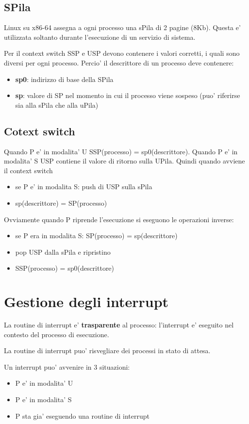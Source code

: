 \documentclass[12pt, a4paper]{report}
\begin{document}
\subsection{SPila}
Linux su x86-64 assegna a ogni processo una sPila di 2 pagine (8Kb). Questa e'
utilizzata soltanto durante l'esecuzione di un servizio di sistema.

Per il context switch SSP e USP devono contenere i valori corretti, i quali sono
diversi per ogni processo. Percio' il descrittore di un processo deve contenere:
\begin{itemize}
	\item \textbf{sp0}: indirizzo di base della SPila
	\item \textbf{sp}: valore di SP nel momento in cui il processo viene sospeso
	      (puo' riferirse sia alla sPila che alla uPila)
\end{itemize}
\subsection{Cotext switch}
Quando P e' in modalita' U SSP(processo) = sp0(descrittore).
Quando P e' in modalita' S USP contiene il valore di ritorno sulla UPila.
Quindi quando avviene il context switch
\begin{itemize}
	\item se P e' in modalita S: push di USP sulla sPila
	\item sp(descrittore) = SP(processo)
\end{itemize}
Ovviamente quando P riprende l'esecuzione si eseguono le operazioni inverse:
\begin{itemize}
	\item se P era in modalita S: SP(processo) = sp(descrittore)
	\item pop USP dalla sPila e ripristino
	\item SSP(processo) = sp0(descrittore)
\end{itemize}
\section{Gestione degli interrupt}
La routine di interrupt e' \textbf{trasparente} al processo: l'interrupt e'
eseguito nel contesto del processo di esecuzione.

La routine di interrupt puo' risvegliare dei processi in stato di attesa.

Un interrupt puo' avvenire in 3 situazioni:
\begin{itemize}
	\item P e' in modalita' U
	\item P e' in modalita' S
	\item P sta gia' eseguendo una routine di interrupt
\end{itemize}
\end{document}
